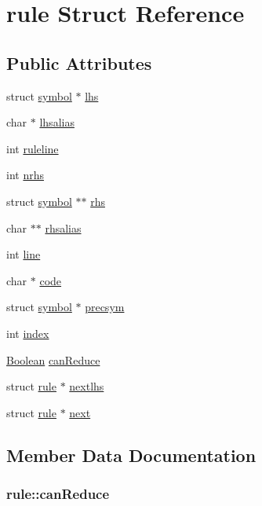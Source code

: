 \hypertarget{structrule}{\section{rule Struct Reference}
\label{structrule}
}
\subsection*{Public Attributes}
\begin{DoxyCompactItemize}
\item 
struct \hyperlink{structsymbol}{symbol} $\ast$ \hyperlink{structrule_af3ef4d474e6a20c17fe3be8adcd460c9}{lhs}
\item 
char $\ast$ \hyperlink{structrule_ac4567bea8eb9b9316ebadf2014fe9069}{lhsalias}
\item 
int \hyperlink{structrule_a158fe6ceafc848655ec981f3f8cc1a7e}{ruleline}
\item 
int \hyperlink{structrule_aa96168d20a55ca25150e6cbd4fe25a58}{nrhs}
\item 
struct \hyperlink{structsymbol}{symbol} $\ast$$\ast$ \hyperlink{structrule_a1f31eea5a96ca6459b6ceef1bdd69817}{rhs}
\item 
char $\ast$$\ast$ \hyperlink{structrule_a39d1131dfe7d988244ac3fe866688dc3}{rhsalias}
\item 
int \hyperlink{structrule_a6d834a168ea936d857d83b6ec36c394e}{line}
\item 
char $\ast$ \hyperlink{structrule_a7c09c584817f17fd7a33a42728b980fc}{code}
\item 
struct \hyperlink{structsymbol}{symbol} $\ast$ \hyperlink{structrule_a4b88c69ede5e1e148b4528ff0c9ccbec}{precsym}
\item 
int \hyperlink{structrule_a89c564aa2e092eb84b9a7a4368fb885a}{index}
\item 
\hyperlink{lemon_8c_ae7d38601dfbd73adbe5c1b3ec34e0e13}{Boolean} \hyperlink{structrule_a0071dadc114152f8ebfb4b238c6e6d68}{can\-Reduce}
\item 
struct \hyperlink{structrule}{rule} $\ast$ \hyperlink{structrule_aab6a3ef5170b0d13e36427abb6f40b26}{nextlhs}
\item 
struct \hyperlink{structrule}{rule} $\ast$ \hyperlink{structrule_a9f774bc10d228f1949db6a601ff8e4f9}{next}
\end{DoxyCompactItemize}


\subsection{Member Data Documentation}
\hypertarget{structrule_a0071dadc114152f8ebfb4b238c6e6d68}{
\subsubsection[{can\-Reduce}]{ rule\-::can\-Reduce}}\label{structrule_a0071dadc114152f8ebfb4b238c6e6d68}


